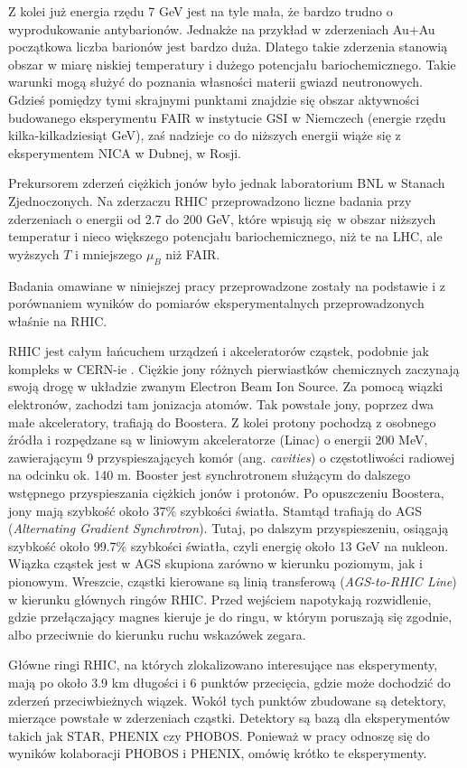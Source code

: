 \documentclass[a4paper,12pt]{article}
\begin{document}
Z kolei już energia rzędu 7 GeV jest na tyle mała, że bardzo trudno o wyprodukowanie antybarionów. Jednakże na przykład w zderzeniach Au+Au początkowa liczba barionów jest bardzo duża. Dlatego takie zderzenia stanowią obszar w miarę niskiej temperatury i dużego potencjału bariochemicznego. Takie warunki mogą służyć do poznania własności materii gwiazd neutronowych.
Gdzieś pomiędzy tymi skrajnymi punktami znajdzie się obszar aktywności budowanego eksperymentu FAIR w instytucie GSI w Niemczech (energie rzędu kilka-kilkadziesiąt GeV), zaś nadzieje co do niższych energii wiąże się z eksperymentem NICA w Dubnej, w Rosji.

Prekursorem zderzeń ciężkich jonów było jednak laboratorium BNL w Stanach Zjednoczonych. Na zderzaczu RHIC przeprowadzono liczne badania przy zderzeniach o energii od 2.7 do 200 GeV, które wpisują się w obszar niższych temperatur i nieco większego potencjału bariochemicznego, niż te na LHC, ale wyższych $T$ i mniejszego $\mu_B$ niż FAIR.

Badania omawiane w niniejszej pracy przeprowadzone zostały na podstawie i z porównaniem wyników do pomiarów eksperymentalnych przeprowadzonych właśnie na RHIC. 

RHIC jest całym łańcuchem urządzeń i akceleratorów cząstek, podobnie jak kompleks w CERN-ie \cite{rhic-website}. Ciężkie jony różnych pierwiastków chemicznych zaczynają swoją drogę w układzie zwanym Electron Beam Ion Source. Za pomocą wiązki elektronów, zachodzi tam jonizacja atomów. Tak powstałe jony, poprzez dwa małe akceleratory, trafiają do Boostera. Z kolei protony pochodzą z osobnego źródła i rozpędzane są w liniowym akceleratorze (Linac) o energii 200 MeV, zawierającym 9 przyspieszających komór (ang. \textit{cavities}) o częstotliwości radiowej na odcinku ok. 140 m. Booster jest synchrotronem służącym do dalszego wstępnego przyspieszania ciężkich jonów i protonów. Po opuszczeniu Boostera, jony mają szybkość około 37\% szybkości światła. Stamtąd trafiają do AGS (\textit{Alternating Gradient Synchrotron}). Tutaj, po dalszym przyspieszeniu, osiągają szybkość około 99.7\% szybkości światła, czyli energię około 13 GeV na nukleon. Wiązka cząstek jest w AGS skupiona zarówno w kierunku poziomym, jak i pionowym. Wreszcie, cząstki kierowane są linią transferową (\textit{AGS-to-RHIC Line}) w kierunku głównych ringów RHIC. Przed wejściem napotykają rozwidlenie, gdzie przełączający magnes kieruje je do ringu, w którym poruszają się zgodnie, albo przeciwnie do kierunku ruchu wskazówek zegara.

Główne ringi RHIC, na których zlokalizowano interesujące nas eksperymenty, mają po około 3.9 km długości i 6 punktów przecięcia, gdzie może dochodzić do zderzeń przeciwbieżnych wiązek. Wokół tych punktów zbudowane są detektory, mierzące powstałe w zderzeniach cząstki. Detektory są bazą dla eksperymentów takich jak STAR, PHENIX czy PHOBOS. Ponieważ w pracy odnoszę się do wyników kolaboracji PHOBOS i PHENIX, omówię krótko te eksperymenty.
\end{document}
